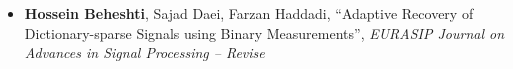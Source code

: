 
\begin{itemize}
	\item{
	            \textbf{Hossein Beheshti}, Sajad Daei, Farzan Haddadi, ``Adaptive Recovery of Dictionary-sparse Signals using Binary Measurements'',
	            \emph{EURASIP Journal on Advances in Signal Processing -- Revise}
	      }
\end{itemize}